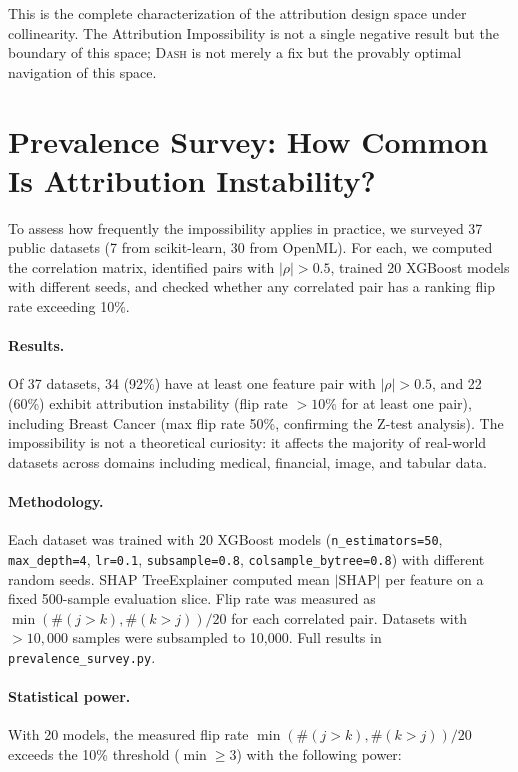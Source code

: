 \documentclass{article}
\newcommand{\DASH}{\textsc{Dash}}
\begin{document}
This is the complete characterization of the attribution design space
under collinearity. The Attribution Impossibility is not a single
negative result but the boundary of this space; \DASH{} is not merely
a fix but the provably optimal navigation of this space.

\section{Prevalence Survey: How Common Is Attribution Instability?}

To assess how frequently the impossibility applies in practice, we
surveyed 37 public datasets (7 from scikit-learn, 30 from OpenML).
For each, we computed the correlation matrix, identified pairs with
$|\rho| > 0.5$, trained 20 XGBoost models with different seeds, and
checked whether any correlated pair has a ranking flip rate exceeding
10\%.

\paragraph{Results.}
Of 37 datasets, 34 (92\%) have at least one feature pair with
$|\rho| > 0.5$, and 22 (60\%) exhibit attribution instability (flip
rate $> 10\%$ for at least one pair), including Breast Cancer
(max flip rate 50\%, confirming the Z-test analysis). The impossibility is not a
theoretical curiosity: it affects the majority of real-world datasets
across domains including medical, financial, image, and tabular data.

\begin{sloppypar}
\paragraph{Methodology.}
Each dataset was trained with 20 XGBoost models
(\texttt{n\_estimators=50}, \texttt{max\_depth=4}, \texttt{lr=0.1},
\texttt{subsample=0.8}, \texttt{colsample\_bytree=0.8}) with
different random seeds. SHAP TreeExplainer computed mean $|\text{SHAP}|$
per feature on a fixed 500-sample evaluation slice. Flip rate was
measured as $\min(\#(j{>}k), \#(k{>}j)) / 20$ for each correlated pair.
Datasets with $> 10{,}000$ samples were subsampled to 10{,}000.
Full results in \texttt{prevalence\_survey.py}.
\end{sloppypar}

\begin{sloppypar}
\paragraph{Statistical power.}
With 20 models, the measured flip rate $\min(\#(j{>}k), \#(k{>}j))/20$
exceeds the 10\% threshold ($\min \geq 3$) with the following power:
\end{sloppypar}
\end{document}
